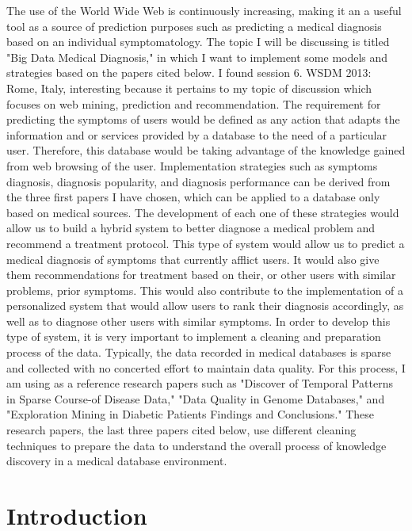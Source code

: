 \documentclass{sig-alternate}
\begin{document}
The use of the World Wide Web is continuously increasing, making it an a useful tool as a source of prediction purposes such as predicting a medical diagnosis based on an individual symptomatology. The topic I will be discussing is titled "Big Data Medical Diagnosis," in which I want to implement some models and strategies based on the papers cited below. I found session 6. WSDM 2013: Rome, Italy, interesting because it pertains to my topic of discussion which focuses on web mining, prediction and recommendation. The requirement for predicting the symptoms of users would be defined as any action that adapts the information and or services provided by a database to the need of a particular user. Therefore, this database would be taking advantage of the knowledge gained from web browsing of the user. Implementation strategies such as symptoms diagnosis, diagnosis popularity, and diagnosis performance can be derived from the three first papers I have chosen, which can be applied to a database only based on medical sources. The development of each one of these strategies would allow us to build a hybrid system to better diagnose a medical problem and recommend a treatment protocol. This type of system would allow us to predict a medical diagnosis of symptoms that currently afflict users. It would also give them recommendations for treatment based on their, or other users with similar problems, prior symptoms. This would also contribute to the implementation of a personalized system that would allow users to rank their diagnosis accordingly, as well as to diagnose other users with similar symptoms. In order to develop this type of system, it is very important to implement a cleaning and preparation process of the data. Typically, the data recorded in medical databases is sparse and collected with no concerted effort to maintain data quality. For this process, I am using as a reference research papers such as "Discover of Temporal Patterns in Sparse Course-of Disease Data," "Data Quality in Genome Databases," and "Exploration Mining in Diabetic Patients Findings and Conclusions." These research papers, the last three papers cited below, use different cleaning techniques to prepare the data to understand the overall process of knowledge discovery in a medical database environment.\newline

\section{Introduction}
\label{Introduction}
\end{document}
